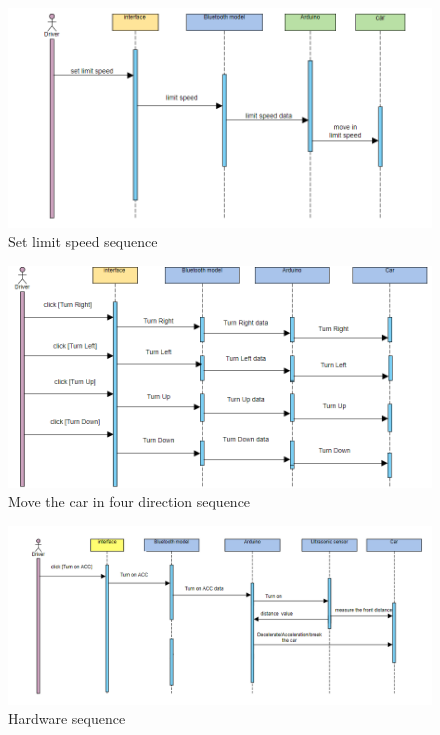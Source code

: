 \documentclass[12pt,a4paper]{report}
\begin{document}
\begin{figure}[H]
    \centering
    \graphicspath{ {./images/} }
    \includegraphics[width=1\textwidth,height=.4\textheight]{case5.png}
    \caption{Set limit speed sequence}
    \label{fig:mesh1}
\end{figure}
\begin{figure}[H]
    \centering
    \graphicspath{ {./images/} }
    \includegraphics[width=1\textwidth]{case6.png}
    \caption{Move the car in four direction sequence}
    \label{fig:mesh1}
\end{figure}
\begin{figure}[H]
    \centering
    \graphicspath{ {./images/} }
    \includegraphics[width=1.05\textwidth,height=.45\textheight]{hard.png}
    \caption{Hardware  sequence}
    \label{fig:mesh1}
\end{figure}
\bigskip
\bigskip
\bigskip
\bigskip
\end{document}

